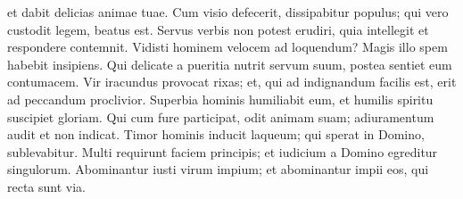 \begin{biblechapter}
\begin{biblechapter}
\begin{biblechapter}
\begin{biblechapter}
\begin{biblechapter}
\begin{biblechapter}
\begin{biblechapter}
\begin{biblechapter}
\begin{biblechapter}
\begin{biblechapter}
\begin{biblechapter}
\begin{biblechapter}
\begin{biblechapter}
\begin{biblechapter}
\begin{biblechapter}
\begin{biblechapter}
\begin{biblechapter}
\begin{biblechapter}
\begin{biblechapter}
\begin{biblechapter}
\begin{biblechapter}
\begin{biblechapter}
\begin{biblechapter}
\begin{biblechapter}
\begin{biblechapter}
\begin{biblechapter}
\begin{biblechapter}
\begin{biblechapter}
\begin{biblechapter}
 et dabit delicias animae tuae.
 \verse Cum visio defecerit, dissipabitur populus;
 qui vero custodit legem, beatus est.
 \verse Servus verbis non potest erudiri,
 quia intellegit et respondere contemnit.
 \verse Vidisti hominem velocem ad loquendum?
 Magis illo spem habebit insipiens.
 \verse Qui delicate a pueritia nutrit servum suum,
 postea sentiet eum contumacem.
 \verse Vir iracundus provocat rixas;
 et, qui ad indignandum facilis est, erit ad peccandum proclivior.
 \verse Superbia hominis humiliabit eum,
 et humilis spiritu suscipiet gloriam.
 \verse Qui cum fure participat, odit animam suam;
 adiuramentum audit et non indicat.
 \verse Timor hominis inducit laqueum;
 qui sperat in Domino, sublevabitur.
 \verse Multi requirunt faciem principis;
 et iudicium a Domino egreditur singulorum.
 \verse Abominantur iusti virum impium;
 et abominantur impii eos, qui recta sunt via.
 

\end{biblechapter}
\end{biblechapter}
\end{biblechapter}
\end{biblechapter}
\end{biblechapter}
\end{biblechapter}
\end{biblechapter}
\end{biblechapter}
\end{biblechapter}
\end{biblechapter}
\end{biblechapter}
\end{biblechapter}
\end{biblechapter}
\end{biblechapter}
\end{biblechapter}
\end{biblechapter}
\end{biblechapter}
\end{biblechapter}
\end{biblechapter}
\end{biblechapter}
\end{biblechapter}
\end{biblechapter}
\end{biblechapter}
\end{biblechapter}
\end{biblechapter}
\end{biblechapter}
\end{biblechapter}
\end{biblechapter}
\end{biblechapter}
